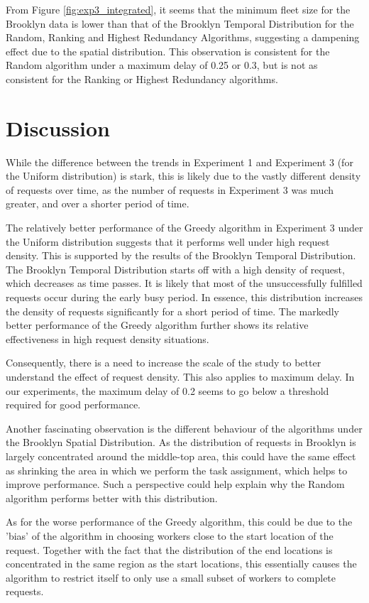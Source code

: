 \documentclass[urop]{socreport}
\begin{document}
From Figure \ref{fig:exp3_integrated}, it seems that the minimum fleet size for the Brooklyn data is lower than that of the Brooklyn Temporal Distribution for the Random, Ranking and Highest Redundancy Algorithms, suggesting a dampening effect due to the spatial distribution. This observation is consistent for the Random algorithm under a maximum delay of 0.25 or 0.3, but is not as consistent for the Ranking or Highest Redundancy algorithms.

\section{Discussion}
While the difference between the trends in Experiment 1 and Experiment 3 (for the Uniform distribution) is stark, this is likely due to the vastly different density of requests over time, as the number of requests in Experiment 3 was much greater, and over a shorter period of time.

The relatively better performance of the Greedy algorithm in Experiment 3 under the Uniform distribution suggests that it performs well under high request density. This is supported by the results of the Brooklyn Temporal Distribution. The Brooklyn Temporal Distribution starts off with a high density of request, which decreases as time passes. It is likely that most of the unsuccessfully fulfilled requests occur during the early busy period. In essence, this distribution increases the density of requests significantly for a short period of time. The markedly better performance of the Greedy algorithm further shows its relative effectiveness in high request density situations.

Consequently, there is a need to increase the scale of the study to better understand the effect of request density. This also applies to maximum delay. In our experiments, the maximum delay of 0.2 seems to go below a threshold required for good performance.

Another fascinating observation is the different behaviour of the algorithms under the Brooklyn Spatial Distribution. As the distribution of requests in Brooklyn is largely concentrated around the middle-top area, this could have the same effect as shrinking the area in which we perform the task assignment, which helps to improve performance. Such a perspective could help explain why the Random algorithm performs better with this distribution.

As for the worse performance of the Greedy algorithm, this could be due to the 'bias' of the algorithm in choosing workers close to the start location of the request. Together with the fact that the distribution of the end locations is concentrated in the same region as the start locations, this essentially causes the algorithm to restrict itself to only use a small subset of workers to complete requests.
\end{document}
